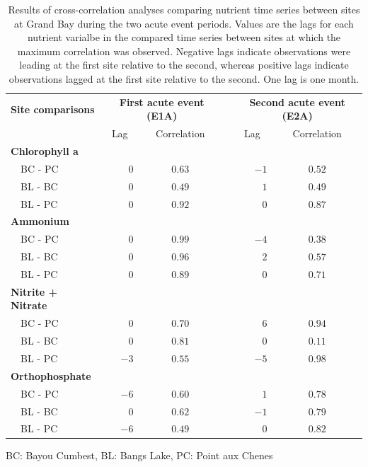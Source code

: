 \documentclass[letterpaper,12pt]{article}\usepackage[]{graphicx}\usepackage[]{color}
\begin{document}
\begin{table}[!tbp]
\caption{Results of cross-correlation analyses comparing nutrient time series between sites at Grand Bay during the two acute event periods.  Values are the lags for each nutrient varialbe in the compared time series between sites at which the maximum correlation was observed.  Negative lags indicate observations were leading at the first site relative to the second, whereas positive lags indicate observations lagged at the first site relative to the second.  One lag is one month.\label{tab:ccfnut}} 
\begin{center}
\begin{tabular}{lrccrc}
\hline\hline
\multicolumn{1}{l}{\bfseries Site comparisons}&\multicolumn{2}{c}{\bfseries First acute event (E1A)}&\multicolumn{1}{c}{\bfseries }&\multicolumn{2}{c}{\bfseries Second acute event (E2A)}\tabularnewline
\cline{2-3} \cline{5-6}
\multicolumn{1}{l}{}&\multicolumn{1}{c}{Lag}&\multicolumn{1}{c}{Correlation}&\multicolumn{1}{c}{}&\multicolumn{1}{c}{Lag}&\multicolumn{1}{c}{Correlation}\tabularnewline
\hline
{\bfseries Chlorophyll a}&&&&&\tabularnewline
~~BC - PC&$ 0$&$0.63$&&$-1$&$0.52$\tabularnewline
~~BL - BC&$ 0$&$0.49$&&$ 1$&$0.49$\tabularnewline
~~BL - PC&$ 0$&$0.92$&&$ 0$&$0.87$\tabularnewline
\hline
{\bfseries Ammonium}&&&&&\tabularnewline
~~BC - PC&$ 0$&$0.99$&&$-4$&$0.38$\tabularnewline
~~BL - BC&$ 0$&$0.96$&&$ 2$&$0.57$\tabularnewline
~~BL - PC&$ 0$&$0.89$&&$ 0$&$0.71$\tabularnewline
\hline
{\bfseries Nitrite + Nitrate}&&&&&\tabularnewline
~~BC - PC&$ 0$&$0.70$&&$ 6$&$0.94$\tabularnewline
~~BL - BC&$ 0$&$0.81$&&$ 0$&$0.11$\tabularnewline
~~BL - PC&$-3$&$0.55$&&$-5$&$0.98$\tabularnewline
\hline
{\bfseries Orthophosphate}&&&&&\tabularnewline
~~BC - PC&$-6$&$0.60$&&$ 1$&$0.78$\tabularnewline
~~BL - BC&$ 0$&$0.62$&&$-1$&$0.79$\tabularnewline
~~BL - PC&$-6$&$0.49$&&$ 0$&$0.82$\tabularnewline
\hline
\end{tabular}\end{center}

\footnotesize BC: Bayou Cumbest, BL: Bangs Lake, PC: Point aux Chenes\end{table}

\clearpage
\end{document}
